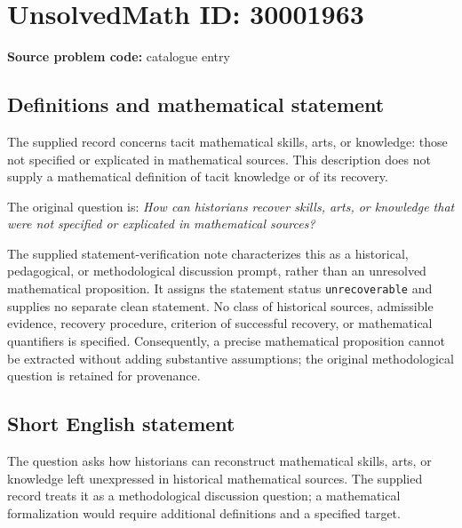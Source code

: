\documentclass[11pt]{article}
\begin{document}
\section*{UnsolvedMath ID: 30001963}
\textbf{Source problem code:} catalogue entry
\subsection{Definitions and mathematical statement}
The supplied record concerns tacit mathematical skills, arts, or knowledge: those not specified or explicated in mathematical sources. This description does not supply a mathematical definition of tacit knowledge or of its recovery.

The original question is: \emph{How can historians recover skills, arts, or knowledge that were not specified or explicated in mathematical sources?}

The supplied statement-verification note characterizes this as a historical, pedagogical, or methodological discussion prompt, rather than an unresolved mathematical proposition. It assigns the statement status \texttt{unrecoverable} and supplies no separate clean statement. No class of historical sources, admissible evidence, recovery procedure, criterion of successful recovery, or mathematical quantifiers is specified. Consequently, a precise mathematical proposition cannot be extracted without adding substantive assumptions; the original methodological question is retained for provenance.
\subsection{Short English statement}
The question asks how historians can reconstruct mathematical skills, arts, or knowledge left unexpressed in historical mathematical sources. The supplied record treats it as a methodological discussion question; a mathematical formalization would require additional definitions and a specified target.
\end{document}
